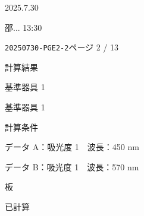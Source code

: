 \documentclass[UTF8,10pt,a4paper,fontset=fandol]{ctexart}
\newcommand{\handwritten}[1]{#1}
\begin{document}
\begin{center}
\begin{center}

\handwritten{2025.7.30}

\handwritten{邵... 13:30}

\newpage

\noindent\texttt{20250730-PGE2-2}\hfill ページ 2 / 13

\vspace{0.5em}

\noindent
計算結果

\noindent
\quad 基準器具 1

\noindent
\quad 基準器具 1

\noindent
\quad 計算条件

\noindent
\quad データ A：吸光度 1　波長：450 nm

\noindent
\quad データ B：吸光度 1　波長：570 nm

\vspace{0.5em}

\noindent
板

\noindent
已計算

\vspace{0.5em}


\end{center}
\end{center}
\end{document}
